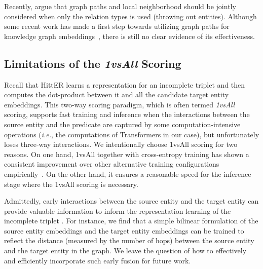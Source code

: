 \documentclass[11pt]{article}
\newcommand{\hit}{HittER\xspace}
\begin{document}
Recently, \citet{wang2020entity} argue that graph paths and local neighborhood should be jointly considered when only the relation types is used (throwing out entities).
Although some recent work has made a first step towards utilizing graph paths for knowledge graph embeddings~\cite{wang2019coke,wang2020dolores}, there is still no clear evidence of its effectiveness.


\subsection{Limitations of the \emph{1vsAll} Scoring}
Recall that \hit{} learns a representation for an incomplete triplet  and then computes the dot-product between it and all the candidate target entity embeddings. This two-way scoring paradigm, which is often termed \textit{1vsAll} scoring, supports fast training and inference when the interactions between the source entity and the predicate are captured by some computation-intensive operations (\textit{i.e.}, the computations of Transformers in our case), but unfortunately loses three-way interactions.
We intentionally choose 1vsAll scoring for two reasons.
On one hand, 1vsAll together with cross-entropy training has shown a consistent improvement over other alternative training configurations empirically~\cite{Ruffinelli2020You}.
On the other hand, it ensures a reasonable speed for the inference stage where the 1vsAll scoring is necessary.

Admittedly, early interactions between the source entity and the target entity can provide valuable information to inform the representation learning of the incomplete triplet .
For instance, we find that a simple bilinear formulation of the source entity embeddings and the target entity embeddings can be trained to reflect the distance (measured by the number of hops) between the source entity and the target entity in the graph.
We leave the question of how to effectively and efficiently incorporate such early fusion for future work.
%
 
\end{document}
